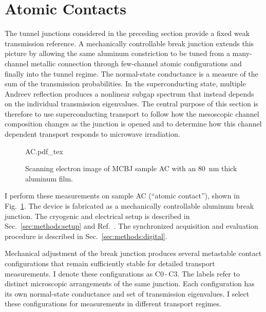 
\section{Atomic Contacts}
\label{sec:atomic-contacts}

    The tunnel junctions considered in the preceding section provide a fixed weak transmission reference. A mechanically controllable break junction extends this picture by allowing the same aluminum constriction to be tuned from a many-channel metallic connection through few-channel atomic configurations and finally into the tunnel regime. The normal-state conductance is a measure of the sum of the transmission probabilities. In the superconducting state, multiple Andreev reflection produces a nonlinear subgap spectrum that instead depends on the individual transmission eigenvalues. The central purpose of this section is therefore to use superconducting transport to follow how the mesoscopic channel composition changes as the junction is opened and to determine how this channel dependent transport responds to microwave irradiation.

    \begin{figure}
        \captionsetup{format=plain}%
        \centering
        \vspace{-0.5em}
        {
            \fontsize{7}{9}\selectfont
            {AC.pdf_tex}
        }
        \vspace{-1.0em}
        \caption{
            Scanning electron image of MCBJ sample AC with an \qty{80}{\nano\meter} thick aluminum film.
        }
        \label{fig:ac:image-AC}
    \end{figure}

    I perform these measurements on sample AC (``atomic contact''), shown in Fig.~\ref{fig:ac:image-AC}. The device is fabricated as a mechanically controllable aluminum break junction. The cryogenic and electrical setup is described in Sec.~\ref{sec:methods:setup} and Ref.~\cite{raif_electronic_2024}. The synchronized acquisition and evaluation procedure is described in Sec.~\ref{sec:methods:digital}.

    Mechanical adjustment of the break junction produces several metastable contact configurations that remain sufficiently stable for detailed transport measurements. I denote these configurations as C0\,-\,C3. The labels refer to distinct microscopic arrangements of the same junction. Each configuration has its own normal-state conductance and set of transmission eigenvalues. I select these configurations for measurements in different transport regimes.

